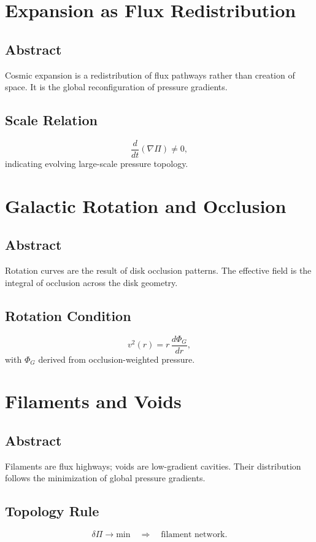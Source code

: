 \documentclass[12pt]{book}
\begin{document}
\chapter{Expansion as Flux Redistribution}

\section*{Abstract}
Cosmic expansion is a redistribution of flux pathways rather than creation of space. It is the global
reconfiguration of pressure gradients.

\section{Scale Relation}
\begin{equation}
\frac{d}{dt}(\nabla \Pi) \neq 0,
\end{equation}
indicating evolving large-scale pressure topology.

\chapter{Galactic Rotation and Occlusion}

\section*{Abstract}
Rotation curves are the result of disk occlusion patterns. The effective field is the integral of
occlusion across the disk geometry.

\section{Rotation Condition}
\begin{equation}
v^2(r) = r\, \frac{d\Phi_G}{dr},
\end{equation}
with $\Phi_G$ derived from occlusion-weighted pressure.

\chapter{Filaments and Voids}

\section*{Abstract}
Filaments are flux highways; voids are low-gradient cavities. Their distribution follows the minimization
of global pressure gradients.

\section{Topology Rule}
\begin{equation}
\delta \Pi \rightarrow \text{min} \quad \Rightarrow \quad \text{filament network}.
\end{equation}
\end{document}
